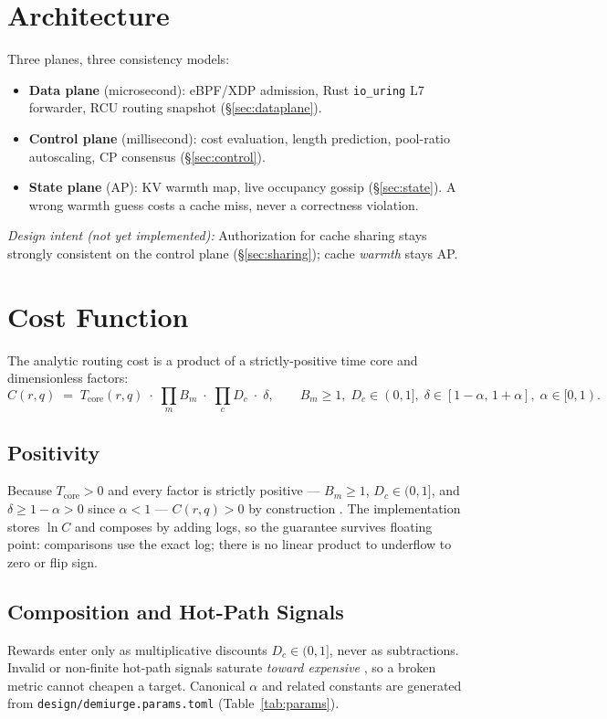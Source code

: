 \documentclass[11pt]{article}
\newcommand{\intent}[1]{\textit{Design intent (not yet implemented):} #1}
\begin{document}
\section{Architecture}\label{sec:arch}
Three planes, three consistency models:
\begin{itemize}[nosep]
  \item \textbf{Data plane} (microsecond): eBPF/XDP admission, Rust
        \texttt{io\_uring} L7 forwarder, RCU routing snapshot
        (\S\ref{sec:dataplane}).
  \item \textbf{Control plane} (millisecond): cost evaluation, length
        prediction, pool-ratio autoscaling, CP consensus (\S\ref{sec:control}).
  \item \textbf{State plane} (AP): KV warmth map, live occupancy gossip
        (\S\ref{sec:state}). A wrong warmth guess costs a cache miss, never a
        correctness violation.
\end{itemize}
\intent{Authorization for cache sharing stays strongly consistent on the control
plane (\S\ref{sec:sharing}); cache \emph{warmth} stays AP.}

\section{Cost Function}\label{sec:cost}
The analytic routing cost is a product of a strictly-positive time core and
dimensionless factors:
\[
  C(r,q) \;=\; T_{\text{core}}(r,q)\;\cdot\;\prod_m B_m\;\cdot\;\prod_c D_c\;\cdot\;\delta,
  \qquad B_m \ge 1,\; D_c \in (0,1],\; \delta \in [1-\alpha,\,1+\alpha],\; \alpha \in [0,1).
\]

\subsection{Positivity}\label{sec:cost-pos}
Because $T_{\text{core}}>0$ and every factor is strictly positive --- $B_m\ge 1$,
$D_c\in(0,1]$, and $\delta\ge 1-\alpha>0$ since $\alpha<1$ --- $C(r,q)>0$ by
construction . The implementation stores $\ln C$ and composes
by adding logs, so the guarantee survives floating point: comparisons use the
exact log; there is no linear product to underflow to zero or flip sign.

\subsection{Composition and Hot-Path Signals}\label{sec:cost-compose}
Rewards enter only as multiplicative discounts $D_c\in(0,1]$, never as
subtractions. Invalid or non-finite hot-path signals saturate \emph{toward
expensive} , so a broken metric cannot cheapen a
target. Canonical $\alpha$ and related constants are generated from
\texttt{design/demiurge.params.toml} (Table~\ref{tab:params}).
\end{document}
